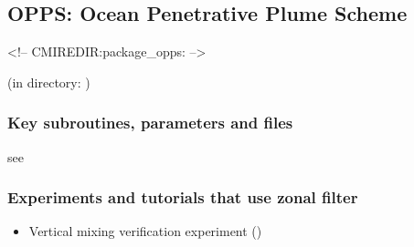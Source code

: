 \subsection{OPPS: Ocean Penetrative Plume Scheme}
\label{sec:opps}
\begin{rawhtml}
<!-- CMIREDIR:package_opps: -->
\end{rawhtml}
\begin{center}
(in directory: )
\end{center}

\subsubsection{Key subroutines, parameters and files}
\label{sec:pkg:opps:implementation_synopsis}
see \cite{pal-rom:97}

\subsubsection{Experiments and tutorials that use zonal filter}
\label{sec:pkg:opps:experiments}

\begin{itemize}
\item Vertical mixing verification experiment ()

\end{itemize}

